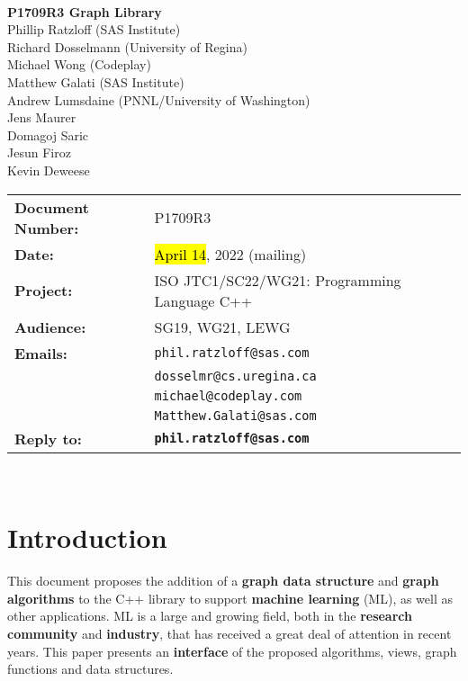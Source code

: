 \documentclass[10pt,onecolumn]{article}
\begin{document}
\begin{titlepage}
~
\vfill
\begin{center}
\LARGE
\textbf{P1709R3 Graph Library}\\
\vspace{12pt}
\normalsize
	Phillip Ratzloff (SAS Institute)\\
	Richard Dosselmann (University of Regina)\\
	Michael Wong (Codeplay)\\
	Matthew Galati (SAS Institute)\\	
	Andrew Lumsdaine (PNNL/University of Washington)\\
	Jens Maurer\\
	Domagoj Saric\\
	Jesun Firoz\\
	Kevin Deweese\\
\end{center}
\vspace{32pt}
\begin{tabular}{ll}
\textbf{Document Number:} & P1709R3\\
\textbf{Date:} & \hl{April 14}, 2022 (mailing)\\ 
\textbf{Project:} & ISO JTC1/SC22/WG21: Programming Language C++\\
\textbf{Audience:} & SG19, WG21, LEWG\\
\textbf{Emails:}
	&\texttt{phil.ratzloff@sas.com}\\
	&\texttt{dosselmr@cs.uregina.ca}\\
	&\texttt{michael@codeplay.com}\\
	&\texttt{Matthew.Galati@sas.com}\\
\textbf{Reply to:}
	&\texttt{\textbf{phil.ratzloff@sas.com}}\\
\end{tabular}
\vfill
~
\end{titlepage}

\tableofcontents

\clearpage

\section{Introduction}
This document proposes the addition of a \textbf{graph data structure} and \textbf{graph algorithms} to the C++ library to support \textbf{machine learning} (ML), as well as other applications. ML is a large and growing field, both in the \textbf{research community} and \textbf{industry}, that has received a great deal of attention in recent years. This paper presents an \textbf{interface} of the proposed algorithms, views, graph functions and data structures.
\end{document}
